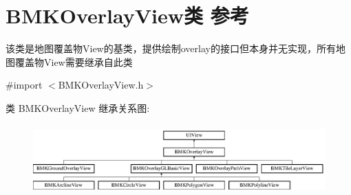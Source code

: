 \hypertarget{interface_b_m_k_overlay_view}{}\section{B\+M\+K\+Overlay\+View类 参考}
\label{interface_b_m_k_overlay_view}


该类是地图覆盖物\+View的基类，提供绘制overlay的接口但本身并无实现，所有地图覆盖物\+View需要继承自此类  




{\ttfamily \#import $<$B\+M\+K\+Overlay\+View.\+h$>$}

类 B\+M\+K\+Overlay\+View 继承关系图\+:\begin{figure}[H]
\begin{center}
\leavevmode
\includegraphics[height=2.666667cm]{interface_b_m_k_overlay_view}
\end{center}
\end{figure}
